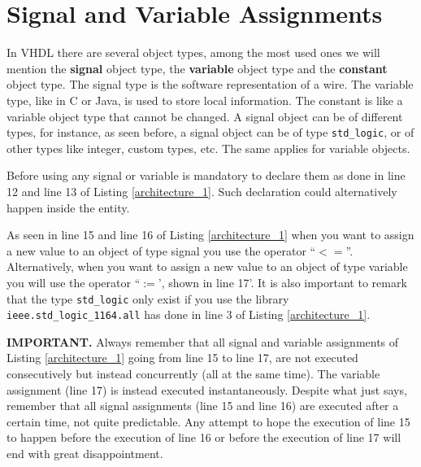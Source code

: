 \section{Signal and Variable Assignments}
In VHDL there are several object types, among the most used ones we will mention the \textbf{signal} object type, the \textbf{variable} object type and the \textbf{constant} object type. The signal type is the software representation of a wire. The variable type, like in C or Java, is used to store local information. The constant is like a variable object type that cannot be changed. A signal object can be of different types, for instance, as seen before, a signal object can be of type \texttt{std\_logic}, or of other types like integer, custom types, etc. The same applies for variable objects.

Before using any signal or variable is mandatory to declare them as done in line 12 and line 13 of Listing \ref{architecture_1}. Such declaration could alternatively happen inside the entity.

As seen in line 15 and line 16 of Listing \ref{architecture_1} when you want to assign a new value to an object of type signal you use the operator ``$<=$''. Alternatively, when you want to assign a new value to an object of type variable you will use the operator ``$:=$', shown in line 17'. It is also important to remark that the type \texttt{std\_logic} only exist if you use the library \texttt{ieee.std\_logic\_1164.all} has done in line 3 of Listing \ref{architecture_1}.

\noindent
\textbf{IMPORTANT.} Always remember that all signal and variable assignments of Listing \ref{architecture_1} going from line 15 to line 17, are not executed consecutively but instead concurrently (all at the same time). The variable assignment (line 17) is instead executed instantaneously. Despite what just says, remember that all signal assignments (line 15 and line 16) are executed after a certain time, not quite predictable. Any attempt to hope the execution of line 15 to happen before the execution of line 16 or before the execution of line 17 will end with great disappointment.

